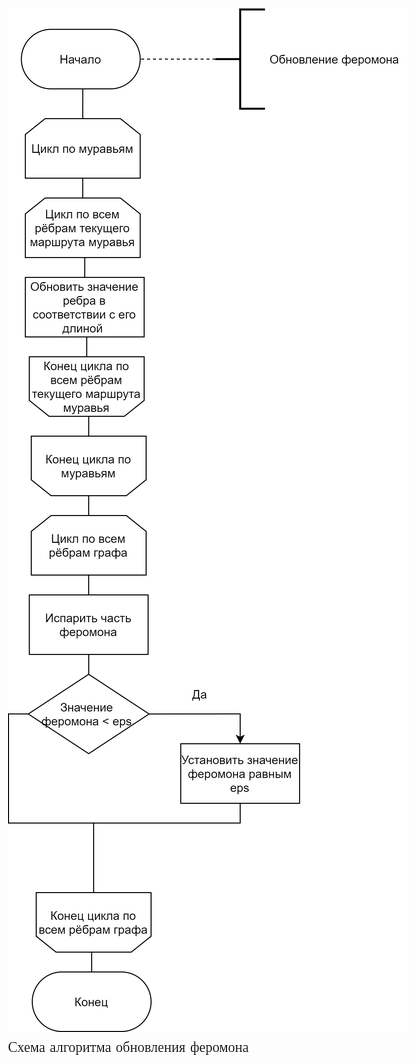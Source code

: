 \documentclass[12pt]{report}
\begin{document}
\begin{figure}[H]
		\centering
		\includegraphics[scale=0.7]{report_files/dg.png}
		\caption{Схема алгоритма обновления феромона}
		\label{fig:ant}
\end{figure}
	
\end{document}
